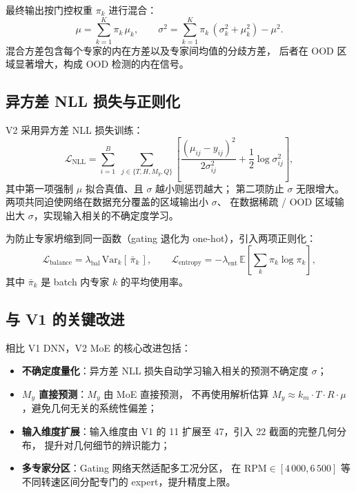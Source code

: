 最终输出按门控权重 $\pi_k$ 进行混合：
\begin{equation}
\mu = \sum_{k=1}^{K} \pi_k\,\mu_k, \qquad
\sigma^2 = \sum_{k=1}^{K} \pi_k\,(\sigma_k^2 + \mu_k^2) - \mu^2.
\end{equation}
混合方差包含每个专家的内在方差以及专家间均值的分歧方差，
后者在 OOD 区域显著增大，构成 OOD 检测的内在信号。

\subsection{异方差 NLL 损失与正则化}

V2 采用异方差 NLL 损失训练：
\begin{equation}
\mathcal{L}_{\text{NLL}} = \sum_{i=1}^{B}\;\sum_{j \in \{T,H,M_y,Q\}}
\left[\frac{(\mu_{ij} - y_{ij})^2}{2\sigma_{ij}^2} + \frac{1}{2}\log\sigma_{ij}^2\right],
\end{equation}
其中第一项强制 $\mu$ 拟合真值、且 $\sigma$ 越小则惩罚越大；
第二项防止 $\sigma$ 无限增大。
两项共同迫使网络在数据充分覆盖的区域输出小 $\sigma$、
在数据稀疏 / OOD 区域输出大 $\sigma$，实现输入相关的不确定度学习。

为防止专家坍缩到同一函数（gating 退化为 one-hot），引入两项正则化：
\begin{equation}
\mathcal{L}_{\text{balance}} = \lambda_{\text{bal}}\,\text{Var}_k\!\left[\,\bar\pi_k\,\right],\qquad
\mathcal{L}_{\text{entropy}} = -\lambda_{\text{ent}}\,\mathbb{E}\!\left[\sum_k \pi_k \log \pi_k\right],
\end{equation}
其中 $\bar\pi_k$ 是 batch 内专家 $k$ 的平均使用率。

\subsection{与 V1 的关键改进}

相比 V1 DNN，V2 MoE 的核心改进包括：
\begin{itemize}
  \item \textbf{不确定度量化}：异方差 NLL 损失自动学习输入相关的预测不确定度 $\sigma$；
  \item \textbf{$M_y$ 直接预测}：$M_y$ 由 MoE 直接预测，
        不再使用解析估算 $M_y \approx k_m \cdot T \cdot R \cdot \mu$，避免几何无关的系统性偏差；
  \item \textbf{输入维度扩展}：输入维度由 V1 的 11 扩展至 47，引入 22 截面的完整几何分布，
        提升对几何细节的辨识能力；
  \item \textbf{多专家分区}：Gating 网络天然适配多工况分区，
        在 $\text{RPM} \in [4\,000, 6\,500]$ 等不同转速区间分配专门的 expert，提升精度上限。
\end{itemize}

